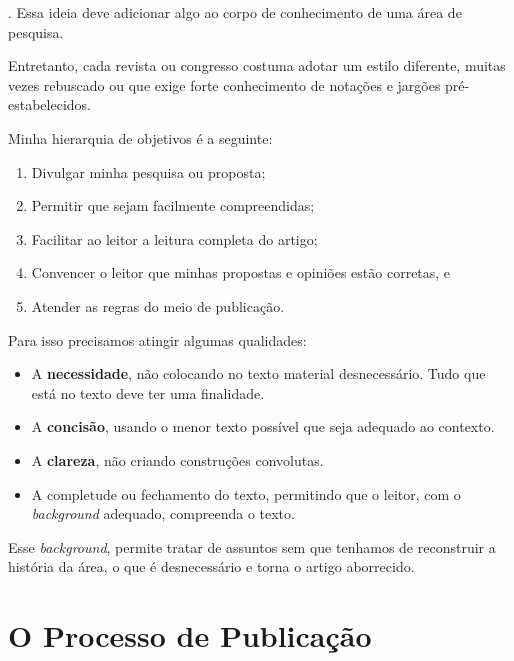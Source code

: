 \documentclass[openany]{book}
\begin{document}
. Essa ideia deve adicionar algo ao corpo de conhecimento de uma área de pesquisa.

 Entretanto, cada revista ou congresso costuma adotar um estilo diferente, muitas vezes  rebuscado ou que exige forte conhecimento de notações e jargões pré-estabelecidos.

Minha hierarquia de objetivos é a seguinte:
\begin{enumerate}
    \item Divulgar minha pesquisa ou proposta;
    \item Permitir que sejam facilmente compreendidas;
    \item Facilitar ao leitor a leitura completa do artigo;
    \item Convencer o leitor que minhas propostas e opiniões estão corretas, e
    \item Atender as regras do meio de publicação.
\end{enumerate}

Para isso precisamos atingir algumas qualidades:
\begin{itemize}
    \item A \textbf{necessidade}, não colocando no texto material desnecessário. Tudo que está no texto deve ter uma finalidade.
    \item A \textbf{concisão}, usando o menor texto possível que seja adequado ao contexto.
    \item A \textbf{clareza}, não criando construções convolutas.
    \item A completude ou fechamento do texto, permitindo que o leitor, com o \textit{background} adequado, compreenda o texto.
\end{itemize}

 Esse \textit{background}, permite tratar de assuntos sem que tenhamos de reconstruir a história da área, o que é desnecessário e torna o artigo aborrecido.




\chapter{O Processo de Publicação}
\end{document}

